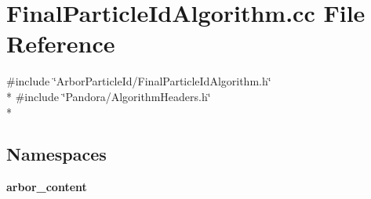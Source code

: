 \section{Final\+Particle\+Id\+Algorithm.\+cc File Reference}
\label{FinalParticleIdAlgorithm_8cc}
{\ttfamily \#include \char`\"{}Arbor\+Particle\+Id/\+Final\+Particle\+Id\+Algorithm.\+h\char`\"{}}\\*
{\ttfamily \#include \char`\"{}Pandora/\+Algorithm\+Headers.\+h\char`\"{}}\\*
\subsection*{Namespaces}
\begin{DoxyCompactItemize}
\item 
 {\bf arbor\+\_\+content}
\end{DoxyCompactItemize}
